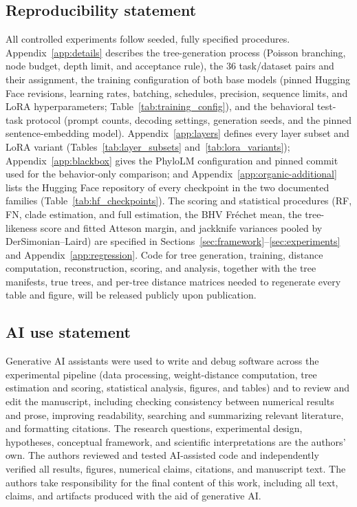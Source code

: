 \documentclass{article}
\theoremstyle{definition}
\theoremstyle{plain}
\begin{document}
\subsection*{Reproducibility statement}
All controlled experiments follow seeded, fully specified procedures. Appendix~\ref{app:details}
describes the tree-generation process (Poisson branching, node budget, depth limit, and acceptance
rule), the 36 task/dataset pairs and their assignment, the training configuration of both base models
(pinned Hugging Face revisions, learning rates, batching, schedules, precision, sequence limits, and
LoRA hyperparameters; Table~\ref{tab:training_config}), and the behavioral test-task protocol (prompt
counts, decoding settings, generation seeds, and the pinned sentence-embedding model).
Appendix~\ref{app:layers} defines every layer subset and LoRA variant (Tables~\ref{tab:layer_subsets}
and~\ref{tab:lora_variants}); Appendix~\ref{app:blackbox} gives the PhyloLM configuration and pinned
commit used for the behavior-only comparison; and Appendix~\ref{app:organic-additional} lists the
Hugging Face repository of every checkpoint in the two documented families (Table~\ref{tab:hf_checkpoints}). The scoring and statistical procedures
(RF, FN, clade estimation, and full estimation, the BHV Fr\'echet mean, the tree-likeness score and fitted Atteson
margin, and jackknife variances pooled by DerSimonian--Laird) are specified in
Sections~\ref{sec:framework}--\ref{sec:experiments} and Appendix~\ref{app:regression}. Code for tree
generation, training, distance computation, reconstruction, scoring, and analysis, together with the
tree manifests, true trees, and per-tree distance matrices needed to regenerate every table
and figure, will be released publicly upon publication.

\subsection*{AI use statement}
Generative AI assistants were used to write and debug software across the experimental
pipeline (data processing, weight-distance computation, tree estimation and scoring, statistical
analysis, figures, and tables) and to review and edit the manuscript, including checking consistency between numerical results and prose,
improving readability, searching and summarizing relevant literature, and formatting citations.  The research questions, experimental design,
hypotheses, conceptual framework, and scientific interpretations are the authors' own. The authors
reviewed and tested AI-assisted code and independently verified all results, figures, numerical claims,
citations, and manuscript text. The authors take responsibility for the final content of this work,
including all text, claims, and artifacts produced with the aid of generative AI.
\end{document}
